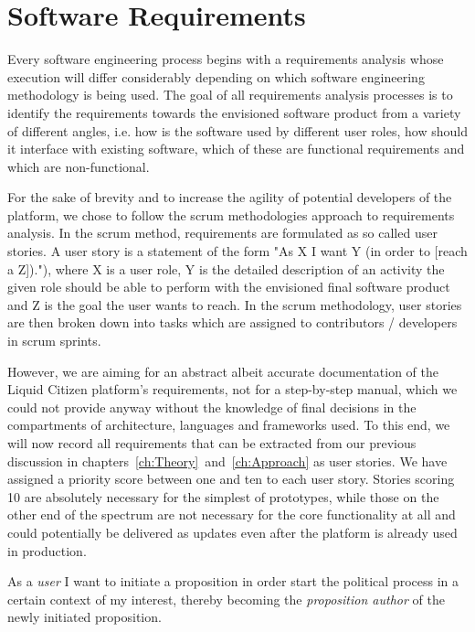 \section{Software Requirements}
\label{sec:SoftwareRequirements}

Every software engineering process begins with a requirements analysis whose execution will differ considerably depending on which software engineering methodology is being used.
The goal of all requirements analysis processes is to identify the requirements towards the envisioned software product from a variety of different angles, i.e. how is the software used by different user roles, how should it interface with existing software, which of these are functional requirements and which are non-functional.

For the sake of brevity and to increase the agility of potential developers of the platform, we chose to follow the scrum methodologies approach to requirements analysis.
In the scrum method, requirements are formulated as so called user stories.
A user story is a statement of the form "As X I want Y (in order to [reach a Z])."), where X is a user role, Y is the detailed description of an activity the given role should be able to perform with the envisioned final software product and Z is the goal the user wants to reach.
In the scrum methodology, user stories are then broken down into tasks which are assigned to contributors / developers in scrum sprints.

However, we are aiming for an abstract albeit accurate documentation of the Liquid Citizen platform's requirements, not for a step-by-step manual, which we could not provide anyway without the knowledge of final decisions in the compartments of architecture, languages and frameworks used.
To this end, we will now record all requirements that can be extracted from our previous discussion in chapters~\ref{ch:Theory}~and~\ref{ch:Approach} as user stories.
We have assigned a priority score between one and ten to each user story. Stories scoring 10 are absolutely necessary for the simplest of prototypes, while those on the other end of the spectrum are not necessary for the core functionality at all and could potentially be delivered as updates even after the platform is already used in production.

As a \textit{user} I want to initiate a proposition in order start the political process in a certain context of my interest, thereby becoming the \textit{proposition author} of the newly initiated proposition.

